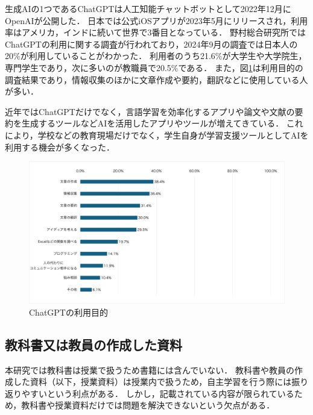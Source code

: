 \documentclass[12pt,a4j,titlepage]{ltjsarticle}
\begin{document}
生成AIの1つであるChatGPTは人工知能チャットボットとして2022年12月にOpenAIが公開した．
日本では公式iOSアプリが2023年5月にリリースされ，利用率はアメリカ，インドに続いて世界で3番目となっている．
野村総合研究所ではChatGPTの利用に関する調査が行われており，2024年9月の調査では日本人の20\%が利用していることがわかった．
利用者のうち21.6\%が大学生や大学院生，専門学生であり，次に多いのが教職員で20.5\%である．
また，図\ref{fig:chat}は利用目的の調査結果であり，情報収集のほかに文章作成や要約，翻訳などに使用している人が多い\cite{nomura}．

近年ではChatGPTだけでなく，言語学習を効率化するアプリや論文や文献の要約を生成するツールなどAIを活用したアプリやツールが増えてきている．
これにより，学校などの教育現場だけでなく，学生自身が学習支援ツールとしてAIを利用する機会が多くなった．

\begin{figure}[!htb]
  \centering
  \includegraphics[width=17cm]{利用目的.pdf}
  \caption{ChatGPTの利用目的}
  \label{fig:chat}
\end{figure}

\clearpage


\subsection{教科書又は教員の作成した資料}
本研究では教科書は授業で扱うため書籍には含んでいない．
教科書や教員の作成した資料（以下，授業資料）は授業内で扱うため，自主学習を行う際には振り返りやすいという利点がある．
しかし，記載されている内容が限られているため，教科書や授業資料だけでは問題を解決できないという欠点がある．
\end{document}
